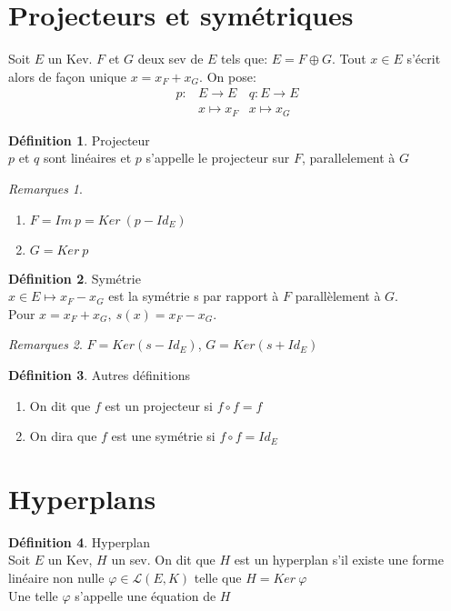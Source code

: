 \documentclass[fleqn]{article}
\theoremstyle{definition} \newtheorem*{defi}{D\'efinition}
\theoremstyle{definition} \newtheorem*{theo}{Th\'eor\`eme}
\theoremstyle{definition} \newtheorem*{coro}{Corollaire}
\theoremstyle{definition} \newtheorem*{nota}{Notation}
\theoremstyle{remark} \newtheorem*{rqs}{Remarques}
\theoremstyle{definition} \newtheorem*{prop}{Propri\'et\'e}
\begin{document}
\section{Projecteurs et sym\'etriques}
Soit $E$ un Kev. $F$ et $G$ deux sev de $E$ tels que: $E = F \oplus G$. Tout $x \in E$ s'\'ecrit alors de fa\c{c}on unique $x = x_F + x_G$. On pose:
\begin{align*} p: &E \rightarrow E  &q: E \rightarrow E\\
			      &x \mapsto x_F &x \mapsto x_G
\end{align*}
\begin{defi} Projecteur \\
	$p$ et $q$ sont lin\'eaires et $p$ s'appelle le projecteur sur $F$, parallelement \`a $G$

	\begin{rqs} $ $
		\begin{enumerate}
			\item $F = Im\ p = Ker\ (p - Id_E)$
			\item $G = Ker\ p$
		\end{enumerate}
	\end{rqs}
\end{defi}

\begin{defi} Sym\'etrie \\
	$x \in E \mapsto x_F - x_G$ est la sym\'etrie s par rapport \`a $F$ parall\`element \`a $G$. \\Pour $x = x_F + x_G,\ s(x) = x_F  - x_G$.

	\begin{rqs}
			$F = Ker (s - Id_E)$, $G = Ker (s + Id_E)$
	\end{rqs}
\end{defi}

\begin{defi} Autres d\'efinitions
	\begin{enumerate}
		\item On dit que $f$ est un projecteur si $f \circ f = f$
		\item On dira que $f$ est une sym\'etrie si $f \circ f = Id_E$
	\end{enumerate}
\end{defi}

\section{Hyperplans}
\begin{defi} Hyperplan \\
	Soit $E$ un Kev, $H$ un sev. On dit que $H$ est un hyperplan s'il existe une forme lin\'eaire non nulle $\varphi \in \mathscr{L}(E,K)$ telle
	que $H = Ker\ \varphi$ \\
	Une telle $\varphi$ s'appelle une \'equation de $H$
\end{defi}
\end{document}
